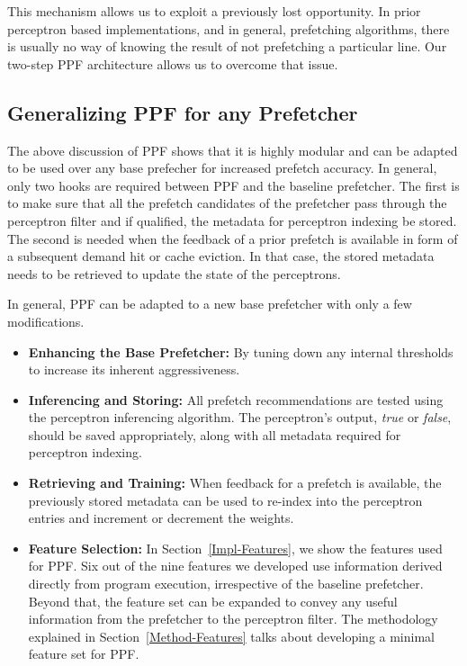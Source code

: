 This mechanism allows us to exploit a previously lost opportunity.  
In prior perceptron based implementations, and in general,
prefetching algorithms, there is usually no way of knowing the result of not
prefetching a particular line.  Our two-step PPF architecture allows us to
overcome that issue.

\subsection{Generalizing PPF for any Prefetcher}
\label{Arch-Generalizing}
The above discussion of PPF shows that it is highly modular and can be
adapted to be used over any base prefecher for increased prefetch accuracy.
In general, only two hooks are required between PPF and the
baseline prefetcher. The first is to make sure that all the prefetch candidates of
the prefetcher pass through the perceptron filter and if qualified, the metadata for
perceptron indexing be stored. The second is needed when the feedback of a
prior prefetch is available in form of a subsequent demand hit or cache
eviction. In that case, the stored metadata needs to be retrieved to update
the state of the perceptrons.

In general, PPF can be adapted to a new base prefetcher with only a few modifications.
\begin{itemize}

\item \textbf{Enhancing the Base Prefetcher:} By tuning down any internal thresholds 
to increase its inherent aggressiveness. 

\item \textbf{Inferencing and Storing:} All prefetch recommendations are
tested using the perceptron inferencing algorithm. The perceptron's output,
\textit{true} or \textit{false}, should be saved appropriately, along with all
 metadata required for perceptron indexing.

\item \textbf{Retrieving and Training:} When feedback for a prefetch is available, the
previously stored metadata can be used to re-index into the perceptron entries
and increment or decrement the weights.

\item \textbf{Feature Selection:} In Section~\ref{Impl-Features}, we show the features 
used for PPF. Six out of the nine features we developed
use information derived directly from program execution, irrespective of the baseline 
prefetcher. Beyond that, the feature set can be expanded to convey any
useful information from the prefetcher to the perceptron filter.  The 
methodology explained in Section~\ref{Method-Features} talks about developing a minimal 
feature set for PPF.

\end{itemize}
